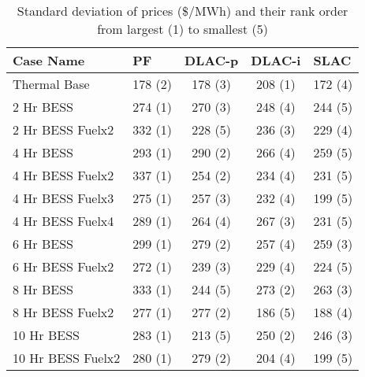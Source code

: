 \begin{table}[htp]
\centering
\caption{Standard deviation of prices (\$/MWh) and their rank order from largest (1) to smallest (5)}
\begin{tabular}{lcccc}
\hline
\textbf{Case Name} & \multicolumn{1}{l}{\textbf{PF}} 
& \multicolumn{1}{l}{\textbf{DLAC-p}} 
& \multicolumn{1}{l}{\textbf{DLAC-i}} 
& \multicolumn{1}{l}{\textbf{SLAC}} 
\\
\hline
Thermal Base & 178 (2) & 178 (3) & 208 (1) & 172 (4) \\
2 Hr BESS & 274 (1) & 270 (3) & 248 (4) & 244 (5) \\
2 Hr BESS Fuelx2 & 332 (1) & 228 (5) & 236 (3) & 229 (4) \\
4 Hr BESS & 293 (1) & 290 (2) & 266 (4) & 259 (5) \\
4 Hr BESS Fuelx2 & 337 (1) & 254 (2) & 234 (4) & 231 (5) \\
4 Hr BESS Fuelx3 & 275 (1) & 257 (3) & 232 (4) & 199 (5) \\
4 Hr BESS Fuelx4 & 289 (1) & 264 (4) & 267 (3) & 231 (5) \\
6 Hr BESS & 299 (1) & 279 (2) & 257 (4) & 259 (3) \\
6 Hr BESS Fuelx2 & 272 (1) & 239 (3) & 229 (4) & 224 (5) \\
8 Hr BESS & 333 (1) & 244 (5) & 273 (2) & 263 (3) \\
8 Hr BESS Fuelx2 & 277 (1) & 277 (2) & 186 (5) & 188 (4) \\
10 Hr BESS & 283 (1) & 213 (5) & 250 (2) & 246 (3) \\
10 Hr BESS Fuelx2 & 280 (1) & 279 (2) & 204 (4) & 199 (5) \\
\hline
\end{tabular}
\label{tab:std_with_ranks}
\end{table}
